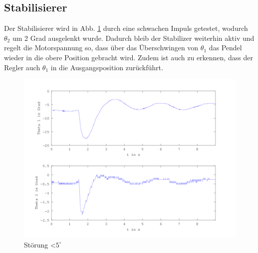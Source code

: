 \subsection{Stabilisierer}

Der Stabilisierer wird in Abb. \ref{fig.Stabilisierer-Plot} durch eine schwachen Impuls getestet, wodurch $\theta_2$ um 2 Grad ausgelenkt wurde. Dadurch bleib der Stabilizer weiterhin aktiv und regelt die Motorspannung so, dass über das Überschwingen von $ \theta_1$ das Pendel wieder in die obere Position gebracht wird. Zudem ist auch zu erkennen, dass der Regler auch $ \theta_1$ in die Ausgangsposition zurückführt.

\begin{figure}[htbp]
	\label{fig.Stabilisierer-Plot}
	\centering
	\includegraphics[width=1.\textwidth]{Grafiken/Stab_lang.png}
	\caption{Störung \textless $5^{\circ}$}
\end{figure}



